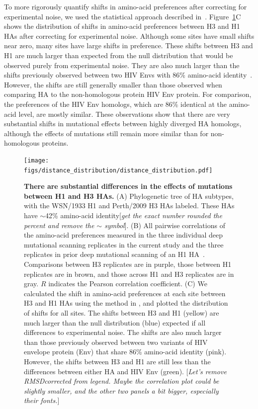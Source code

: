 \documentclass[9pt,twocolumn,twoside]{pnas-new}
\newcommand{\comment}[1]{{\color{red}[\textsl{#1}]}}
\begin{document}
To more rigorously quantify shifts in amino-acid preferences after correcting for experimental noise, we used the statistical approach described in~\cite{doud2015site,haddox2017mapping}.
Figure~\ref{fig:distance_distribution}C shows the distribution of shifts in amino-acid preferences between H3 and H1 HAs after correcting for experimental noise.
Although some sites have small shifts near zero, many sites have large shifts in preference.
These shifts between H3 and H1 are much larger than expected from the null distribution that would be observed purely from experimental noise.
They are also much larger than the shifts previously observed between two HIV Envs with 86\% amino-acid identity~\cite{haddox2017mapping}.
However, the shifts are still generally smaller than those observed when comparing HA to the non-homologous protein HIV Env protein. 
For comparison, the preferences of the HIV Env homologs, which are 86\% identical at the amino-acid level, are mostly similar. 
These observations show that there are very substantial shifts in mutational effects between highly diverged HA homologs, although the effects of mutations still remain more similar than for non-homologous proteins.

\begin{figure}
\centering
\texttt{[image: figs/distance\_distribution/distance\_distribution.pdf]}
\caption{\label{fig:distance_distribution}
{\bf There are substantial differences in the effects of mutations between H1 and H3 HAs.}
(A) Phylogenetic tree of HA subtypes, with the WSN/1933 H1 and Perth/2009 H3 HAs labeled. 
These HAs have $\sim$42\% amino-acid identity\comment{get the exact number rounded the percent and remove the $\sim$ symbol}.
(B) All pairwise correlations of the amino-acid preferences measured in the three individual deep mutational scanning replicates in the current study  and the three replicates in prior deep mutational scanning of an H1 HA~\cite{doud2016accurate}.
Comparisons between H3 replicates are in purple, those between H1 replicates are in brown, and those across H1 and H3 replicates are in gray. 
$R$ indicates the Pearson correlation coefficient.
(C) We calculated the shift in amino-acid preferences at each site between H3 and H1 HAs using the method in \cite{haddox2017mapping}, and plotted the distribution of shifts for all sites.
The shifts between H3 and H1 (yellow) are much larger than the null distribution (blue) expected if all differences to experimental noise.
The shifts are also much larger than those previously observed between two variants of HIV envelope protein (Env) that share 86\% amino-acid identity (pink).
However, the shifts between H3 and H1 are still less than the differences between either HA and HIV Env (green).
\comment{Let's remove RMSDcorrected from legend.
Maybe the correlation plot could be slightly smaller, and the other two panels a bit bigger, especially their fonts.}
}
\end{figure}
\end{document}
